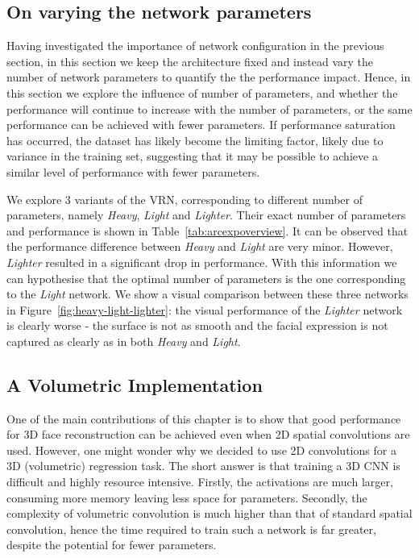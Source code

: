 \subsection{On varying the network parameters}
\label{sec:arc_params}

Having investigated the importance of network configuration in the
previous section, in this section we keep the architecture fixed and
instead vary the number of network parameters to quantify the the
performance impact. Hence, in this section we explore the influence of
number of parameters, and whether the performance will continue to
increase with the number of parameters, or the same performance can be
achieved with fewer parameters. If performance saturation has
occurred, the dataset has likely become the limiting factor, likely
due to variance in the training set, suggesting that it may be
possible to achieve a similar level of performance with fewer
parameters.

We explore 3 variants of the VRN, corresponding to different number of
parameters, namely \textit{Heavy}, \textit{Light} and
\textit{Lighter}. Their exact number of parameters and performance is
shown in Table~\ref{tab:arcexpoverview}. It can be observed that the
performance difference between \textit{Heavy} and \textit{Light} are
very minor. However, \textit{Lighter} resulted in a significant drop
in performance. With this information we can hypothesise that the
optimal number of parameters is the one corresponding to the
\textit{Light} network. We show a visual comparison between these
three networks in Figure~\ref{fig:heavy-light-lighter}: the visual
performance of the \textit{Lighter} network is clearly worse - the
surface is not as smooth and the facial expression is not captured as
clearly as in both \textit{Heavy} and \textit{Light}.

\subsection{A Volumetric Implementation}
\label{sec:arc_volumetric}

One of the main contributions of this chapter is to show that good
performance for 3D face reconstruction can be achieved even when 2D
spatial convolutions are used.  However, one might wonder why we
decided to use 2D convolutions for a 3D (volumetric) regression
task. The short answer is that training a 3D CNN is difficult and
highly resource intensive. Firstly, the activations are much larger,
consuming more memory leaving less space for parameters. Secondly, the
complexity of volumetric convolution is much higher than that of
standard spatial convolution, hence the time required to train such a
network is far greater, despite the potential for fewer parameters.

